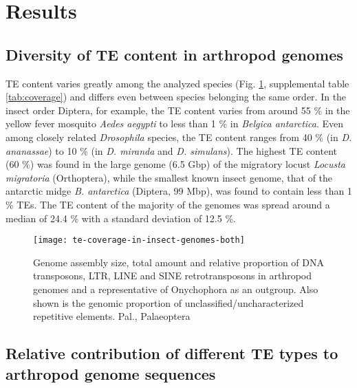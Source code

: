 \section{Results}

\subsection{Diversity of TE content in arthropod genomes}

TE content varies greatly among the analyzed species (Fig.
\ref{fig:te-coverage}, supplemental table \ref{tab:coverage}) and
differs even between species belonging the same order. In the insect
order Diptera, for example, the TE content varies from around 55 \% in
the yellow fever mosquito \emph{Aedes aegypti} to less than 1 \% in
\emph{Belgica antarctica}. Even among closely related \emph{Drosophila}
species, the TE content ranges from 40 \% (in \emph{D. ananassae}) to 10
\% (in \emph{D. miranda} and \emph{D.  simulans}). The highest TE
content (60 \%) was found in the large genome (6.5 Gbp) of the migratory
locust \emph{Locusta migratoria} (Orthoptera), while the smallest known
insect genome, that of the antarctic midge \emph{B. antarctica}
(Diptera, 99 Mbp), was found to contain less than 1 \% TEs. The TE
content of the majority of the genomes was spread around a median of
24.4 \% with a standard deviation of 12.5 \%.

\begin{figure}[h!]
\begin{center}
\texttt{[image: te-coverage-in-insect-genomes-both]}
\caption[Arthropod genome size and TE coverage]{{Genome assembly size,
total amount and relative proportion of DNA transposons, LTR, LINE and
SINE retrotransposons in arthropod genomes and a representative of
Onychophora as an outgroup. Also shown is the genomic proportion of
unclassified/uncharacterized repetitive elements.  Pal., Palaeoptera%
\label{fig:te-coverage}
}}
\end{center}
\end{figure}

\subsection{Relative contribution of different TE types to arthropod
genome sequences}

